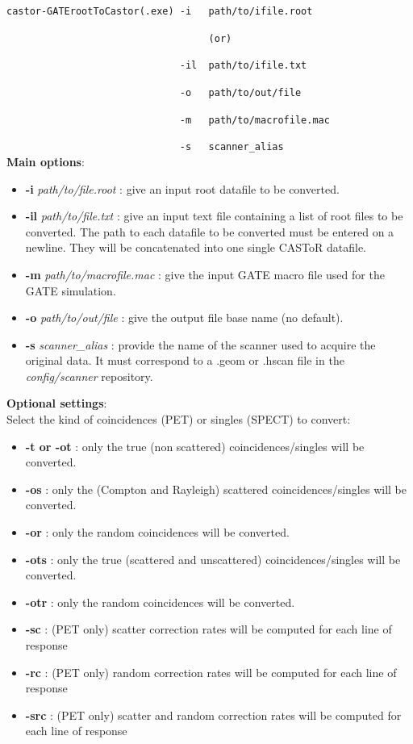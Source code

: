 \documentclass[a4paper, 11pt]{article}
\begin{document}
\verb|castor-GATErootToCastor(.exe) -i   path/to/ifile.root|

\verb|                                   (or)|

\verb|                              -il  path/to/ifile.txt|

\verb|                              -o   path/to/out/file|

\verb|                              -m   path/to/macrofile.mac|

\verb|                              -s   scanner_alias|\\

\textbf{Main options}:
\begin{itemize}
  \item \textbf{-i} \textit{path/to/file.root}      : give an input root datafile to be converted.
  \item \textbf{-il} \textit{path/to/file.txt}      : give an input text file containing a list of root files to be converted. The path to
        each datafile to be converted must be entered on a newline. They will be concatenated into one single CASToR datafile.
  \item \textbf{-m}  \textit{path/to/macrofile.mac} : give the input GATE macro file used for the GATE simulation.
  \item \textbf{-o}  \textit{path/to/out/file}      : give the output file base name (no default).
  \item \textbf{-s}  \textit{scanner\_alias}        : provide the name of the scanner used to acquire the original data. It must
        correspond to a .geom or .hscan file in the \textit{config/scanner} repository.
\end{itemize}

\textbf{Optional settings}:\\

Select the kind of coincidences (PET) or singles (SPECT) to convert:
\begin{itemize}
  \item \textbf{-t or -ot}  : only the true (non scattered) coincidences/singles will be converted.
  \item \textbf{-os} : only the (Compton and Rayleigh) scattered coincidences/singles will be converted.
  \item \textbf{-or} : only the random coincidences will be converted.
  \item \textbf{-ots} : only the true (scattered and unscattered) coincidences/singles will be converted.
  \item \textbf{-otr} : only the random coincidences will be converted.
  \item \textbf{-sc} : (PET only) scatter correction rates will be computed for each line of response
  \item \textbf{-rc} : (PET only) random correction rates will be computed for each line of response
  \item \textbf{-src} : (PET only) scatter and random correction rates will be computed for each line of response \\ 
  \end{itemize} 
  
\end{document}
